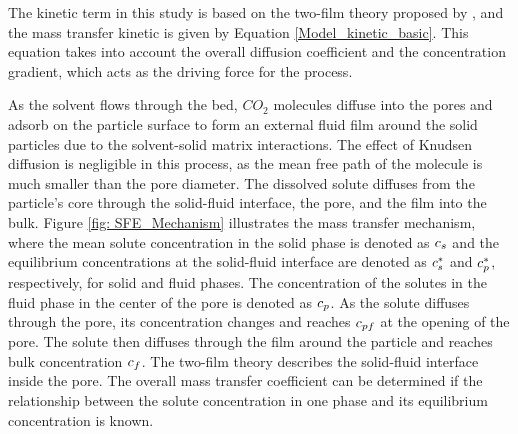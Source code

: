 \documentclass[../Article_Model_Parameters.tex]{subfiles}
\begin{document}
	The kinetic term in this study is based on the two-film theory proposed by \citet{Reverchon1996}, and the mass transfer kinetic is given by Equation \ref{Model_kinetic_basic}. This equation takes into account the overall diffusion coefficient and the concentration gradient, which acts as the driving force for the process.
	
	
	As the solvent flows through the bed, $CO_2$ molecules diffuse into the pores and adsorb on the particle surface to form an external fluid film around the solid particles due to the solvent-solid matrix interactions. The effect of Knudsen diffusion is negligible in this process, as the mean free path of the molecule is much smaller than the pore diameter. The dissolved solute diffuses from the particle's core through the solid-fluid interface, the pore, and the film into the bulk. Figure \ref{fig: SFE_Mechanism} illustrates the mass transfer mechanism, where the mean solute concentration in the solid phase is denoted as ${\color{black}c_s}$ and the equilibrium concentrations at the solid-fluid interface are denoted as ${\color{black}c_s^*}$ and ${\color{black}c_p^*}$, respectively, for solid and fluid phases. The concentration of the solutes in the fluid phase in the center of the pore is denoted as ${\color{black}c_{p}}$. As the solute diffuses through the pore, its concentration changes and reaches ${\color{black}c_{pf}}$ at the opening of the pore. The solute then diffuses through the film around the particle and reaches bulk concentration ${\color{black}c_f}$. The two-film theory describes the solid-fluid interface inside the pore. The overall mass transfer coefficient can be determined if the relationship between the solute concentration in one phase and its equilibrium concentration is known.
			
\end{document}
